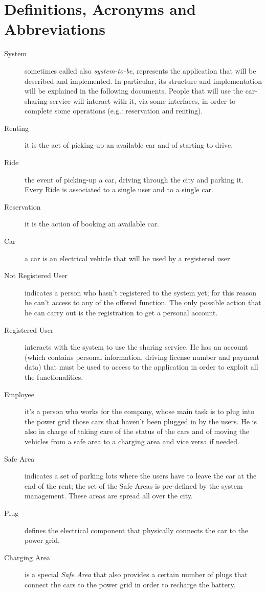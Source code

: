 \documentclass[11pt,a4paper]{report}
\begin{document}
\section{Definitions, Acronyms and Abbreviations}
\begin{description}
\item[System] sometimes called also \textit{system-to-be}, represents the application that will be described and implemented.
In particular, its structure and implementation will be explained in the following documents. People that will use the car-sharing service will interact with it, via some interfaces, in order to complete some operations (e.g.: reservation and renting).
\item[Renting] it is the act of picking-up an available car and of starting to drive.
\item[Ride] the event of picking-up a car, driving through the city and parking it. Every Ride is associated to a single user and to a single car.
\item[Reservation] it is the action of booking an available car.
\item[Car] a car is an electrical vehicle that will be used by a registered user.
\item[Not Registered User] indicates a person who hasn't registered to the system yet; for this reason he can't access to any of the offered function. The only possible action that he can carry out is the registration to get a personal account.
\item[Registered User] interacts with the system to use the sharing service. He has an account (which contains personal information, driving license number and payment data) that must be used to access to the application in order to exploit all the functionalities.
\item[Employee] it's a person who works for the company, whose main task is to plug into the power grid those cars that haven't been plugged in by the users. He is also in charge of taking care of the status of the cars and of moving the vehicles from a safe area to a charging area and vice versa if needed.
\item[Safe Area] indicates a set of parking lots where the users have to leave the car at the end of the rent; the set of the Safe Areas is pre-defined by the system management. These areas are spread all over the city.
\item[Plug] defines the electrical component that physically connects the car to the power grid.
\item[Charging Area] is a special \textit{Safe Area} that also provides a certain number of plugs that connect the cars to the power grid in order to recharge the battery.

\end{description}
\end{document}
